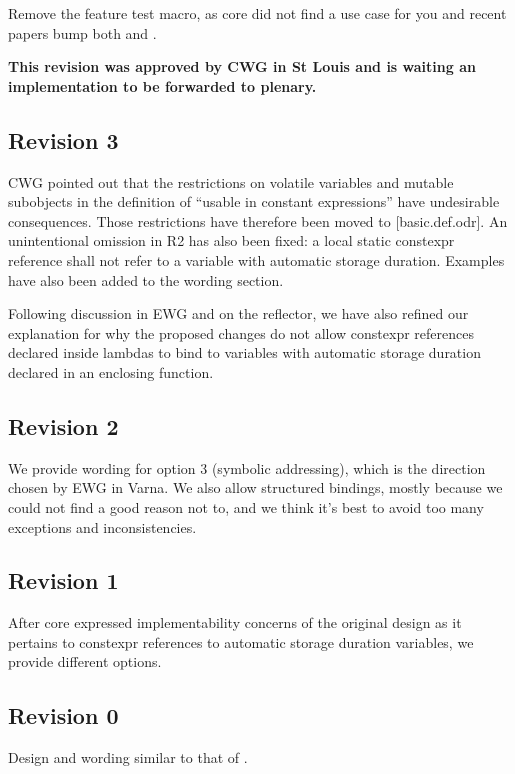 \documentclass{wg21}
\begin{document}
Remove the feature test macro, as core did not find a use case for you and recent papers
bump both  and .

\textbf{This revision was approved by CWG in St Louis and is waiting an implementation to be forwarded to plenary.}

\subsection{Revision 3}

CWG pointed out that the restrictions on volatile variables and mutable subobjects in the definition of ``usable in constant expressions'' have undesirable consequences. Those restrictions have therefore been moved to [basic.def.odr]. An unintentional omission in R2 has also been fixed: a local static constexpr reference shall not refer to a variable with automatic storage duration. Examples have also been added to the wording section.

Following discussion in EWG and on the reflector, we have also refined our explanation for why the proposed changes do not allow constexpr references declared inside lambdas to bind to variables with automatic storage duration declared in an enclosing function.

\subsection{Revision 2}

We provide wording for option 3 (symbolic addressing), which is the direction chosen by EWG in Varna.
We also allow  structured bindings, mostly because we could not find a good reason not to,
and we think it's best to avoid too many exceptions and inconsistencies.

\subsection{Revision 1}

After core expressed implementability concerns of the original design as it pertains to constexpr references to automatic storage duration variables, we provide different options.

\subsection{Revision 0}

Design and wording similar to that of .
\end{document}
